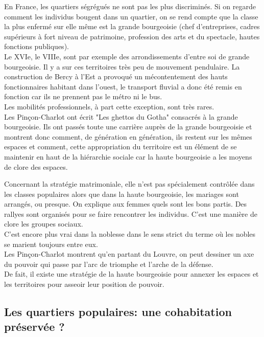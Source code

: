 \documentclass[10pt, a4paper, openany]{book}
\begin{document}
En France, les quartiers ségrégués ne sont pas les plus discriminés. Si on regarde comment les individus bougent dans un quartier, on se rend compte que la classe la plus enfermé sur elle même est la grande bourgeoisie (chef d'entreprises, cadres supérieurs à fort niveau de patrimoine, profession des arts et du spectacle, hautes fonctions publiques). \\
Le XVIe, le VIIIe, sont par exemple des arrondissements d'entre soi de grande bourgeoisie. Il y a sur ces territoires très peu de mouvement pendulaire. La construction de Bercy à l'Est a provoqué un mécontentement des hauts fonctionnaires habitant dans l'ouest, le transport fluvial a donc été remis en fonction car ils ne prennent pas le métro ni le bus. \\
Les mobilités professionnels, à part cette exception, sont très rares. \\
Les Pinçon-Charlot ont écrit "Les ghettos du Gotha" consacrés à la grande bourgeoisie. Ils ont passés toute une carrière auprès de la grande bourgeoisie et montrent donc comment, de génération en génération, ils restent sur les mêmes espaces et comment, cette appropriation du territoire est un élément de se maintenir en haut de la hiérarchie sociale car la haute bourgeoisie a les moyens de clore des espaces.


Concernant la stratégie matrimoniale, elle n'est pas spécialement contrôlée dans les classes populaires alors que dans la haute bourgeoisie, les mariages sont arrangés, ou presque. On explique aux femmes quels sont les bons partis. Des rallyes sont organisés pour se faire rencontrer les individus. C'est une manière de clore les groupes sociaux. \\
C'est encore plus vrai dans la noblesse dans le sens strict du terme où les nobles se marient toujours entre eux. \\
Les Pinçon-Charlot montrent qu'en partant du Louvre, on peut dessiner un axe du pouvoir qui passe par l'arc de triomphe et l'arche de la défense. \\
De fait, il existe une stratégie de la haute bourgeoisie pour annexer les espaces et les territoires pour asseoir leur position de pouvoir. 

\subsection{Les quartiers populaires: une cohabitation préservée ?}
\end{document}
